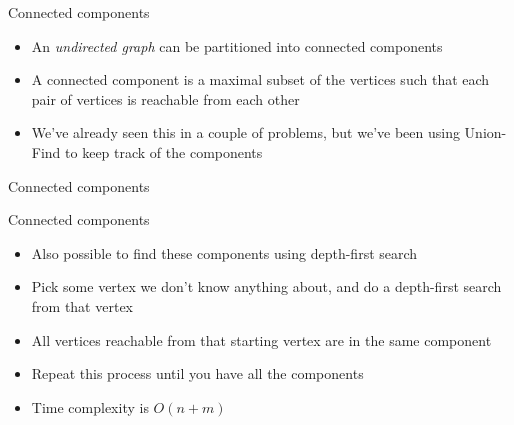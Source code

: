 \documentclass{beamer}
\begin{document}
\begin{frame}[plain]{Connected components}
    \vspace{30pt}
    \begin{itemize}
        \item An \emph{undirected graph} can be partitioned into connected components
        \item A connected component is a maximal subset of the vertices such that each pair of vertices is reachable from each other

        \vspace{10pt}

        \item We've already seen this in a couple of problems, but we've been using Union-Find to keep track of the components
    \end{itemize}
\end{frame}

\begin{frame}[plain]{Connected components}
\end{frame}

\begin{frame}[plain]{Connected components}
    \vspace{30pt}
    \begin{itemize}
        \item Also possible to find these components using depth-first search
        \item Pick some vertex we don't know anything about, and do a depth-first search from that vertex
        \item All vertices reachable from that starting vertex are in the same component
        \item Repeat this process until you have all the components
        \item Time complexity is $O(n + m)$
    \end{itemize}
\end{frame}
\end{document}
